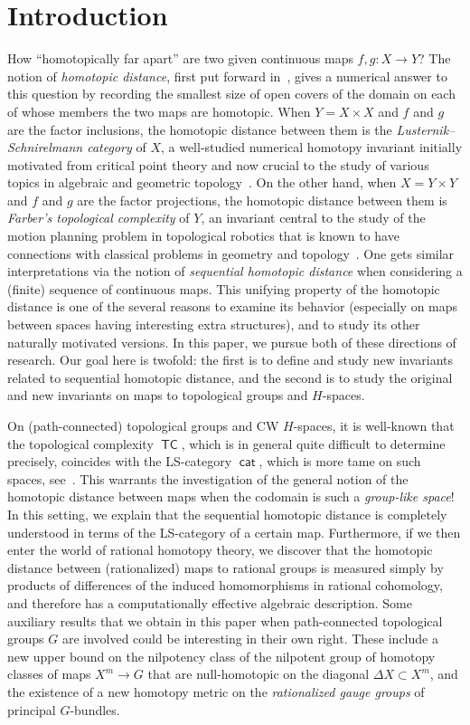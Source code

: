 \documentclass[amscd,amssymb,verbatim,10pt]{amsart}
\numberwithin{equation}{section}
\theoremstyle{plain}
\theoremstyle{definition}
\DeclareMathOperator{\cat}{{\mathsf{cat}}}
\DeclareMathOperator{\TC}{{\mathsf{TC}}}
\begin{document}
\section{Introduction}\label{sec: intro}
How ``homotopically far apart'' are two given continuous maps $f,g\colon X \to Y$? The notion of \emph{homotopic distance}, first put forward in~\cite{MM}, gives a numerical answer to this question by recording the smallest size of open covers of the domain on each of whose members the two maps are homotopic. When $Y=X\times X$ and $f$ and $g$ are the factor inclusions, the homotopic distance between them is the \emph{Lusternik--Schnirelmann category} of $X$, a well-studied numerical homotopy invariant initially motivated from critical point theory and now crucial to the study of various topics in algebraic and geometric topology~\cite{CLOT}. On the other hand, when $X=Y\times Y$ and $f$ and $g$ are the factor projections, the homotopic distance between them is \emph{Farber's topological complexity} of $Y$, an invariant central to the study of the motion planning problem in topological robotics that is known to have connections with classical problems in geometry and topology~\cite{Farber book}. One gets similar interpretations via the notion of \emph{sequential homotopic distance} when considering a (finite) sequence of continuous maps. 
This unifying property of the homotopic distance is one of the several reasons to examine its behavior (especially on maps between spaces having interesting extra structures), and to study its other naturally motivated versions. In this paper, we pursue both of these directions of research. Our goal here is twofold: the first is to define and study new invariants related to sequential homotopic distance, and the second is to study the original and new invariants on maps to topological groups and $H$-spaces.

On (path-connected) topological groups and CW $H$-spaces, it is well-known that the topological complexity $\TC$, which is in general quite difficult to determine precisely, coincides with the LS-category $\cat$, which is more tame on such spaces, see~\cite{Far,LS}. This warrants the investigation of the general notion of the homotopic distance between maps when the codomain is such a \emph{group-like space}! In this setting, we explain that the sequential homotopic distance is completely understood in terms of the LS-category of a certain map. Furthermore, if we then enter the world of rational homotopy theory, we discover that the homotopic distance between (rationalized) maps to rational groups is measured simply by products of differences of the induced homomorphisms in rational cohomology, and therefore has a computationally effective algebraic description. Some auxiliary results that we obtain in this paper when path-connected topological groups $G$ are involved could be interesting in their own right. These include a new upper bound on the nilpotency class of the nilpotent group of homotopy classes of maps $X^m\to G$ that are null-homotopic on the diagonal $\Delta X\subset X^m$, and the existence of a new homotopy metric on the \emph{rationalized gauge groups} of principal $G$-bundles.
\end{document}
